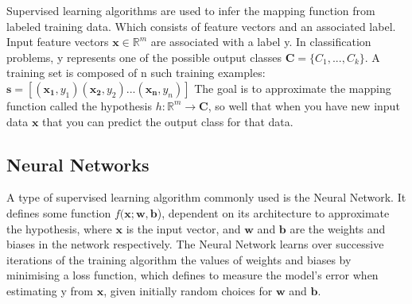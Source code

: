 \documentclass[withindex,glossary]{cam-thesis}
\newcommand{\R}{\mathbb{R}}
\begin{document}
Supervised learning algorithms are used to infer the mapping function from labeled training data. Which consists of feature vectors and an associated label. Input feature vectors
 $\mathbf{x} \in \R^{m}$ are associated with a label y. In classification problems, y represents one of the possible output classes $\mathbf{C} = \{C_1, ..., C_k\}$.
 A training set is composed of n such training examples: $\mathbf{s} = [(\mathbf{x_1}, y_1) (\mathbf{x_2}, y_2) ... (\mathbf{x_n}, y_n)]$
The goal is to approximate the mapping function called the hypothesis $h:  \R^{m} \rightarrow \mathbf{C}$,  so well that when you have new input data $\mathbf{x}$ that you can predict the output class for that data.

\subsection{Neural Networks}
A type of supervised learning algorithm commonly used is the Neural Network. It defines some function $f(\mathbf{x};\mathbf{w}, \mathbf{b}$), dependent on its architecture to approximate the hypothesis, where $\mathbf{x}$ is the input vector, and $\mathbf{w}$ and $\mathbf{b}$ are the weights and biases in the network respectively. The Neural Network learns over successive iterations of the training algorithm the values of weights and biases by minimising a loss function, which  defines to measure the model’s error when estimating y from $\mathbf{x}$, given initially random choices for $\mathbf{w}$ and $\mathbf{b}$.
\end{document}
